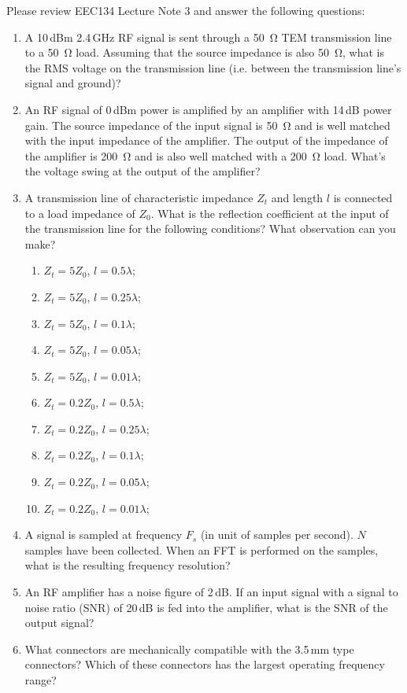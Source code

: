 \documentclass[letterpaper, 11pt]{article}
\begin{document}
Please review EEC134 Lecture Note 3 and answer the following questions:
\begin{enumerate}[itemsep=0.1ex, label=\alph*)]
	\item A 10\,dBm 2.4\,GHz RF signal is sent through a \SI{50}{\ohm} TEM transmission line to a \SI{50}{\ohm} load. Assuming that the source impedance is also \SI{50}{\ohm}, what is the RMS voltage on the transmission line (i.e. between the transmission line's signal and ground)?
	
	\item An RF signal of 0\,dBm power is amplified by an amplifier with 14\,dB power gain. The source impedance of the input signal is \SI{50}{\ohm} and is well matched with the input impedance of the amplifier. The output of the impedance of the amplifier is \SI{200}{\ohm} and is also well matched with a \SI{200}{\ohm} load. What's the voltage swing at the output of the amplifier?
	
	\item A transmission line of characteristic impedance $Z_t$ and length $l$ is connected to a load impedance of $Z_0$. What is the reflection coefficient at the input of the transmission line for the following conditions? What observation can you make? 
		\begin{enumerate}[label=\roman*)]
			\item $Z_t = 5 Z_0$, $l = 0.5\lambda$;
			\item $Z_t = 5 Z_0$, $l = 0.25\lambda$;
			\item $Z_t = 5 Z_0$, $l = 0.1\lambda$;
			\item $Z_t = 5 Z_0$, $l = 0.05\lambda$;
			\item $Z_t = 5 Z_0$, $l = 0.01\lambda$;
			\item $Z_t = 0.2 Z_0$, $l = 0.5\lambda$;
			\item $Z_t = 0.2 Z_0$, $l = 0.25\lambda$;
			\item $Z_t = 0.2 Z_0$, $l = 0.1\lambda$;
			\item $Z_t = 0.2 Z_0$, $l = 0.05\lambda$;
			\item $Z_t = 0.2 Z_0$, $l = 0.01\lambda$;
		\end{enumerate}
	
	\item A signal is sampled at frequency $F_s$ (in unit of samples per second). $N$ samples have been collected. When an FFT is performed on the samples, what is the resulting frequency resolution?
	
	\item An RF amplifier has a noise figure of 2\,dB. If an input signal with a signal to noise ratio (SNR) of 20\,dB is fed into the amplifier, what is the SNR of the output signal?
	
	\item What connectors are mechanically compatible with the 3.5\,mm type connectors? Which of these connectors has the largest operating frequency range?

\end{enumerate}
\end{document}
